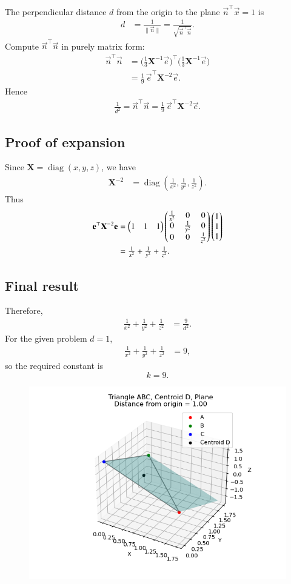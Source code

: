 \documentclass[journal]{IEEEtran}
\begin{document}
The perpendicular distance \(d\) from the origin to the plane $\vec{n}^{\top}\vec{x}=1$ is
\begin{align}
d &= \frac{1}{\|\vec{n}\|}
   = \frac{1}{\sqrt{\vec{n}^{\top}\vec{n}}}.
\end{align}
Compute $\vec{n}^{\top}\vec{n}$ in purely matrix form:
\begin{align}
\vec{n}^{\top}\vec{n}
&= \Big(\tfrac{1}{3}\mathbf{X}^{-1}\vec{e}\Big)^{\top}
   \Big(\tfrac{1}{3}\mathbf{X}^{-1}\vec{e}\Big) \\
&= \tfrac{1}{9}\,\vec{e}^{\top}\mathbf{X}^{-2}\vec{e}.
\end{align}
Hence
\begin{align}
\frac{1}{d^2} = \vec{n}^{\top}\vec{n} = \tfrac{1}{9}\,\vec{e}^{\top}\mathbf{X}^{-2}\vec{e}.
\end{align}

\subsection*{Proof of expansion}

Since $\mathbf{X}=\operatorname{diag}(x,y,z)$, we have
\begin{align}
\mathbf{X}^{-2} &= \operatorname{diag}\!\left(\tfrac{1}{x^2},\tfrac{1}{y^2},\tfrac{1}{z^2}\right).
\end{align}
Thus
\begin{align}
\mathbf{e}^{\top}\mathbf{X}^{-2}\mathbf{e}
&= \begin{pmatrix}1&1&1\end{pmatrix}
   \begin{pmatrix}
     \tfrac{1}{x^2} & 0 & 0 \\
     0 & \tfrac{1}{y^2} & 0 \\
     0 & 0 & \tfrac{1}{z^2}
   \end{pmatrix}
   \begin{pmatrix}1\\1\\1\end{pmatrix} \\
&= \tfrac{1}{x^2}+\tfrac{1}{y^2}+\tfrac{1}{z^2}.
\end{align}

\subsection*{Final result}

Therefore,
\begin{align}
\frac{1}{x^2}+\frac{1}{y^2}+\frac{1}{z^2} &= \frac{9}{d^2}.
\end{align}
For the given problem $d=1$,
\begin{align}
\frac{1}{x^2}+\frac{1}{y^2}+\frac{1}{z^2} &= 9,
\end{align}
so the required constant is
\[
\boxed{k=9}.
\]

\begin{figure}[H]
    \centering
    \includegraphics[width=0.8\linewidth]{figs/fig1.png}
    \caption{}
    \label{fig:fig1}
\end{figure}
\end{document}
